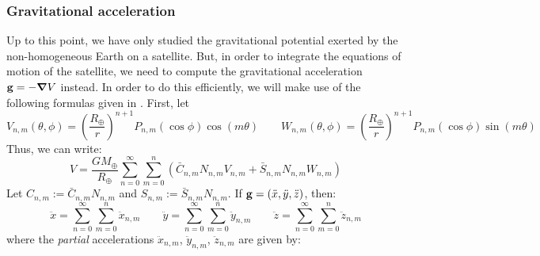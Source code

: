 \documentclass[../main.tex]{subfiles}
\begin{document}
\subsubsection{Gravitational acceleration}
Up to this point, we have only studied the gravitational potential exerted by the non-homogeneous Earth on a satellite. But, in order to integrate the equations of motion of the satellite, we need to compute the gravitational acceleration $\boldsymbol{\mathrm{g}}=-\grad{V}$ instead. In order to do this efficiently, we will make use of the following formulas given in \cite{montenbruck,cunningham}. First, let
\begin{equation}
  V_{n,m}(\theta,\phi)={\left(\frac{R_\oplus}{r}\right)}^{n+1} P_{n,m}(\cos\phi)\cos(m \theta)\qquad W_{n,m}(\theta,\phi)={\left(\frac{R_\oplus}{r}\right)}^{n+1} P_{n,m}(\cos\phi)\sin(m \theta)
\end{equation}
Thus, we can write:
\begin{equation}
  V=\frac{GM_\oplus}{R_\oplus}\sum_{n=0}^\infty \sum_{m=0}^n (\bar{C}_{n,m}N_{n,m} V_{n,m}+\bar{S}_{n,m}N_{n,m} W_{n,m})
\end{equation}
Let $C_{n,m}:= \bar{C}_{n,m}N_{n,m}$ and $ S_{n,m}:= \bar{S}_{n,m}N_{n,m}$. If $\boldsymbol{\mathrm{g}}=(\ddot{x}, \ddot{y}, \ddot{z})$, then:
\begin{equation}\label{eq:acceleration}
  \ddot{x} = \sum_{n=0}^\infty \sum_{m=0}^n\ddot{x}_{n,m}\qquad \ddot{y} = \sum_{n=0}^\infty \sum_{m=0}^n\ddot{y}_{n,m}\qquad \ddot{z} = \sum_{n=0}^\infty \sum_{m=0}^n\ddot{z}_{n,m}
\end{equation}
where the \textit{partial} accelerations $\ddot{x}_{n,m}$, $\ddot{y}_{n,m}$, $\ddot{z}_{n,m}$ are given by:
\end{document}
